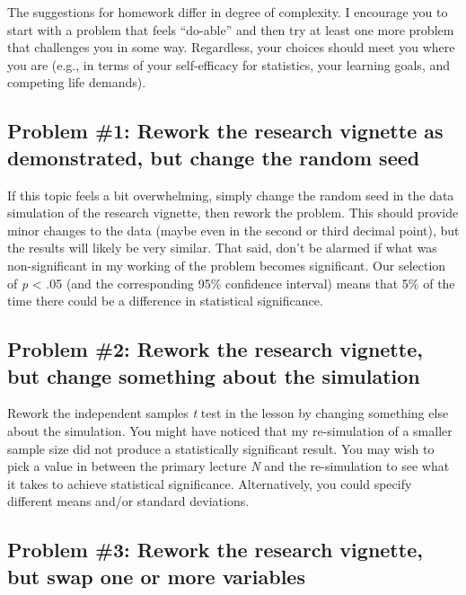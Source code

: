 \documentclass[
  11pt,
]{book}
\begin{document}
The suggestions for homework differ in degree of complexity. I encourage you to start with a problem that feels ``do-able'' and then try at least one more problem that challenges you in some way. Regardless, your choices should meet you where you are (e.g., in terms of your self-efficacy for statistics, your learning goals, and competing life demands).

\hypertarget{problem-1-rework-the-research-vignette-as-demonstrated-but-change-the-random-seed-1}{%
\subsection{Problem \#1: Rework the research vignette as demonstrated, but change the random seed}\label{problem-1-rework-the-research-vignette-as-demonstrated-but-change-the-random-seed-1}}

If this topic feels a bit overwhelming, simply change the random seed in the data simulation of the research vignette, then rework the problem. This should provide minor changes to the data (maybe even in the second or third decimal point), but the results will likely be very similar. That said, don't be alarmed if what was non-significant in my working of the problem becomes significant. Our selection of \emph{p} \textless{} .05 (and the corresponding 95\% confidence interval) means that 5\% of the time there could be a difference in statistical significance.

\hypertarget{problem-2-rework-the-research-vignette-but-change-something-about-the-simulation-1}{%
\subsection{Problem \#2: Rework the research vignette, but change something about the simulation}\label{problem-2-rework-the-research-vignette-but-change-something-about-the-simulation-1}}

Rework the independent samples \emph{t} test in the lesson by changing something else about the simulation. You might have noticed that my re-simulation of a smaller sample size did not produce a statistically significant result. You may wish to pick a value in between the primary lecture \emph{N} and the re-simulation to see what it takes to achieve statistical significance. Alternatively, you could specify different means and/or standard deviations.

\hypertarget{problem-3-rework-the-research-vignette-but-swap-one-or-more-variables}{%
\subsection{Problem \#3: Rework the research vignette, but swap one or more variables}\label{problem-3-rework-the-research-vignette-but-swap-one-or-more-variables}}
\end{document}
